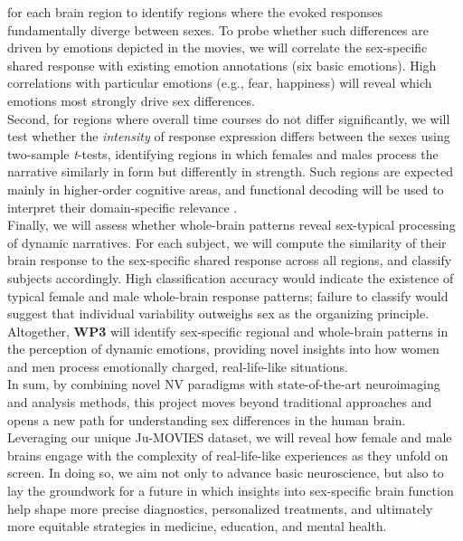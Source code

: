 \documentclass[11pt,a4paper]{article}
\begin{document}
for each brain region to identify regions where the evoked responses fundamentally diverge between sexes. 
To probe whether such differences are driven by emotions depicted in the movies, we will correlate the 
sex-specific shared response with existing emotion annotations (six basic emotions). 
High correlations with particular emotions (e.g., fear, happiness) will reveal which emotions most 
strongly drive sex differences.\\
Second, for regions where overall time courses do not differ significantly, we will test whether the \textit{intensity} of 
response expression differs between the sexes using two-sample \textit{t}-tests, identifying regions in which 
females and males process the narrative similarly in form but differently in strength. 
Such regions are expected mainly in higher-order cognitive areas, and functional decoding will be
used to interpret their domain-specific relevance \parencite{foxMetaanalysisHumanNeuroimaging2014a}.\\  
Finally, we will assess whether whole-brain patterns reveal sex-typical processing of dynamic narratives. 
For each subject, we will compute the similarity of their brain response to the sex-specific shared response 
across all regions, and classify subjects accordingly. High classification accuracy would indicate 
the existence of typical female and male whole-brain response patterns; failure to classify would 
suggest that individual variability outweighs sex as the organizing principle.\\
Altogether, \textbf{WP3} will identify sex-specific regional and whole-brain patterns in the perception of 
dynamic emotions, providing novel insights into how women and men process emotionally charged, 
real-life-like situations.\\  
[6pt]
In sum, by combining novel NV paradigms with state-of-the-art neuroimaging and analysis methods, 
this project moves beyond traditional approaches and opens a new path for understanding sex differences 
in the human brain. Leveraging our unique Ju-MOVIES dataset, we will reveal how female and male brains engage 
with the complexity of real-life-like experiences as they unfold on screen.
In doing so, we aim not only to advance basic neuroscience, 
but also to lay the groundwork for a future in which insights into sex-specific brain 
function help shape more precise diagnostics, personalized treatments, and ultimately more equitable 
strategies in medicine, education, and mental health.

\newpage
\end{document}
